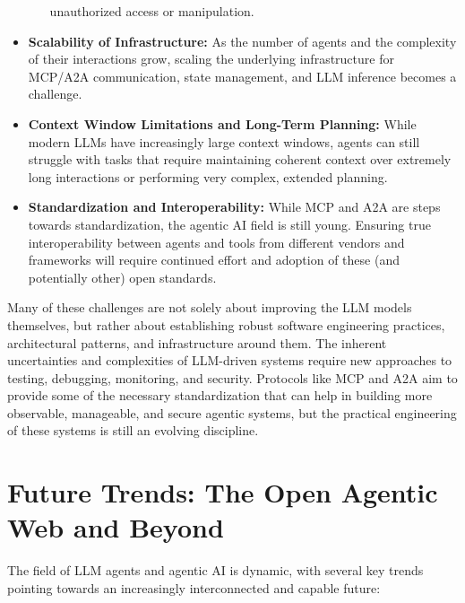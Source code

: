 \begin{itemize}
\begin{itemize}
        unauthorized access or manipulation.
    \end{itemize}
    \item \textbf{Scalability of Infrastructure:} As the number of agents and the complexity of their interactions grow, scaling the
     underlying infrastructure for MCP/A2A communication, state management, and LLM inference becomes a challenge.
    \item \textbf{Context Window Limitations and Long-Term Planning:} While modern LLMs have increasingly large context windows, 
    agents can still struggle with tasks that require maintaining coherent context over extremely long interactions or 
    performing very complex, extended planning.
    \item \textbf{Standardization and Interoperability:} While MCP and A2A are steps towards standardization, 
    the agentic AI field is still young. Ensuring true interoperability between agents and tools from different vendors and 
    frameworks will require continued effort and adoption of these (and potentially other) open standards.
\end{itemize}

Many of these challenges are not solely about improving the LLM models themselves, but rather about establishing robust software engineering practices, 
architectural patterns, and infrastructure around them. The inherent uncertainties and complexities of LLM-driven systems 
require new approaches to testing, debugging, monitoring, and security. Protocols like MCP and A2A aim to provide some of the necessary 
standardization that can help in building more observable, manageable, and secure agentic systems, but the practical engineering of these 
systems is still an evolving discipline.

\section{Future Trends: The Open Agentic Web and Beyond}

The field of LLM agents and agentic AI is dynamic, with several key trends pointing towards an increasingly interconnected and capable future:

